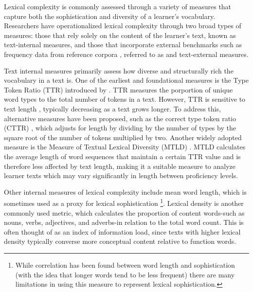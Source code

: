 
Lexical complexity is commonly assessed through a variety of measures that capture both the sophistication and
diversity of a learner's vocabulary. Researchers have operationalized lexical complexity through two broad types of
measures: those that rely solely on the content of the learner's text, known as
text-internal measures, and those that incorporate external benchmarks such as frequency data from reference
corpora , referred to as and text-external measures\citep{Butle2012}.

Text internal measures primarily assess how diverse and structurally rich the vocabulary in a text is.
One of the
earliest
and
foundational measures is the Type Token Ratio (TTR) introduced by \citet{Templin1957}. TTR measures the porportion of
unique word types to the total number of tokens in a text. However, TTR is sensitive to text
length
\citep{koizumi2012}, typically decreasing as a text grows longer. To address this, alternative measures have been
proposed, such as the correct type token ratio (CTTR)
\citep{Carroll1964}, which adjusts for length by dividing by the number of types by the square root of the
number of tokens multiplied by two. Another widely adopted measure is the Measure of Textual Lexical Diversity (MTLD)
\citep{McCarthy2010}. MTLD
calculates the average length of word
sequences that maintain a certain TTR value and is therefore less affected by text length, making it a suitable
measure to analyze learner texts which may vary significantly in length between proficiency levels.

Other internal measures
 of lexical complexity include
mean word length, which is sometimes used as a proxy for lexical sophistication
\footnote{ While correlation has been found between word length and sophistication (with the idea that longer words tend to be less frequent) there are many limitations in using this measure to represent lexical sophistication.}. Lexical density is another commonly used metric, which calculates the proportion
of content words-such as nouns, verbs, adjectives, and adverbs-in relation to the total word count. This is often
thought of as an index of information load, since texts with higher lexical density typically converse more
conceptual content relative to function words.

